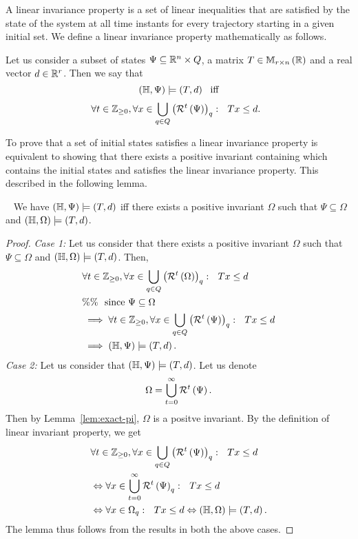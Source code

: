 A linear invariance property is a set of linear inequalities that are
satisfied by the state of the system at all time instants for every
trajectory starting in a given initial set.  We define a linear
invariance property mathematically as follows.  
%
\begin{definition}
Let us consider a subset of states
$\Psi\subseteq\mathbb{R}^n\times Q$, a matrix
$T\in\mathbb{M}_{r\times n}\left(\mathbb{R}\right)$ and a real vector $d\in\mathbb{R}^r$.  Then we
say that \[\left(\mathbb{H},\Psi\right)\models\left(T,d\right)~~\text{iff}\] 
%
\begin{align*}\
& \forall t\in\mathbb{Z}_{\geq 0},\forall
 x\in\bigcup_{q\in Q}\left(\mathcal{R}^{t}\left(\Psi\right)\right)_q:~~
 Tx\leq d.
\end{align*}
%
\end{definition}
%
To prove that a set of initial states satisfies a linear invariance
property is equivalent to showing that there exists a positive
invariant containing which contains the initial states and satisfies
the linear invariance property.  This described in the following
lemma.
%
\begin{lemma}~\label{lem:pi-ver}
We have
$\left(\mathbb{H},\Psi\right)\models\left(T,d\right)$ iff there
exists a positive invariant $\Omega$ such that $\Psi\subseteq\Omega$
and $\left(\mathbb{H},\Omega\right)\models\left(T,d\right)$.
\end{lemma}
%
\begin{proof}
{\it Case 1:}  Let us consider that there exists a
positive invariant $\Omega$ such that
$\Psi\subseteq\Omega$ and $\left(\mathbb{H},\Omega\right)\models\left(T,d\right)$.  Then,
%
\begin{align*}
& \forall t\in\mathbb{Z}_{\geq 0},\forall
 x\in\bigcup_{q\in Q}\left(\mathcal{R}^{t}\left(\Omega\right)\right)_q:~~
 Tx\leq d\\
& \%\%~~\text{since}~\Psi\subseteq\Omega\\
& \implies \forall t\in\mathbb{Z}_{\geq 0},\forall
 x\in\bigcup_{q\in Q}\left(\mathcal{R}^{t}\left(\Psi\right)\right)_q:~~
 Tx\leq d\\
& \implies \left(\mathbb{H},\Psi\right)\models\left(T,d\right).
\end{align*}
%
{\it Case 2:}  Let us consider that $\left(\mathbb{H},\Psi\right)\models\left(T,d\right)$.  Let us denote 
%
\[
\Omega=\bigcup_{t=0}^\infty\mathcal{R}^{t}\left(\Psi\right).
\]
% 
Then by Lemma~\ref{lem:exact-pi}, $\Omega$ is a positve invariant.  By
the definition of linear invariant property, we get 
%
\begin{align*}
& \forall t\in\mathbb{Z}_{\geq 0},\forall
 x\in\bigcup_{q\in Q}\left(\mathcal{R}^{t}\left(\Psi\right)\right)_q:~~
 Tx\leq d\\
& \Leftrightarrow \forall
x\in\bigcup_{t=0}^\infty\mathcal{R}^{t}\left(\Psi\right)_q:~~Tx\leq d\\
& \Leftrightarrow \forall x\in\Omega_q:~~Tx\leq d
\Leftrightarrow \left(\mathbb{H},\Omega\right)\models\left(T,d\right).
\end{align*}
%
The lemma thus follows from the results in both the above cases.
\end{proof}
%

